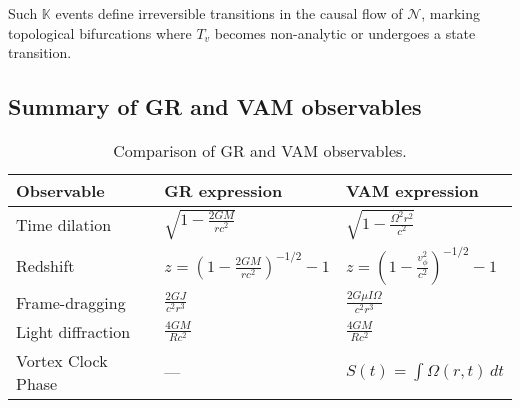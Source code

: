 Such $\mathbb{K}$ events define irreversible transitions in the causal flow of $\mathcal{N}$, marking topological bifurcations where $T_v$ becomes non-analytic or undergoes a state transition.

\subsection*{Summary of GR and VAM observables}

\begin{table}[h!]
    \centering
    \begin{tabular}{lll}
        \toprule
        \textbf{Observable} & \textbf{GR expression} & \textbf{VAM expression} \\
        \midrule
        Time dilation & $\sqrt{1-\frac{2GM}{rc^2}}$ & $\sqrt{1-\frac{\Omega^2 r^2}{c^2}}$\\[0.5em]
        Redshift & $z=\left(1-\frac{2GM}{rc^2}\right)^{-1/2}-1$ & $z=\left(1-\frac{v_\phi^2}{c^2}\right)^{-1/2}-1$\\[0.5em]
        Frame-dragging & $\frac{2GJ}{c^2 r^3}$ & $\frac{2G\mu I\Omega}{c^2 r^3}$\\[0.5em]
        Light diffraction & $\frac{4GM}{Rc^2}$ & $\frac{4GM}{Rc^2}$\\
        Vortex Clock Phase & — & $S(t) = \int \Omega(r,t)\, dt$ \\
        \bottomrule
    \end{tabular}
    \caption{Comparison of GR and VAM observables.}
    \label{tab:equations}
\end{table}